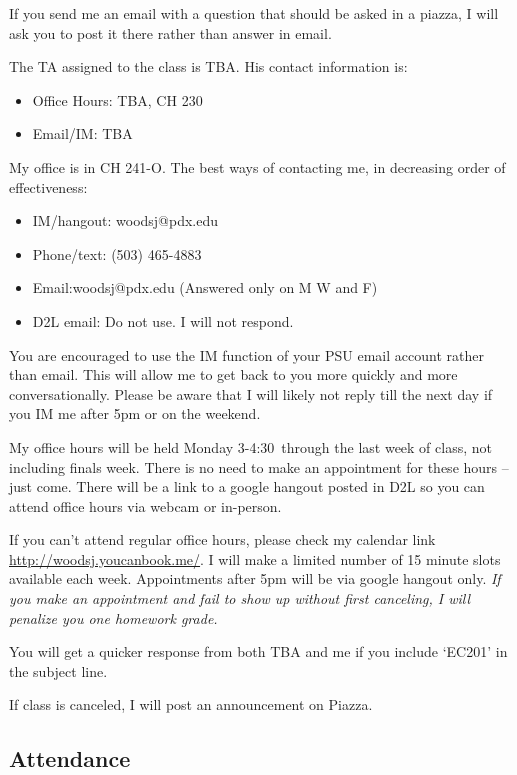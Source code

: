 \documentclass[letterpaper,10pt]{article}
\newcommand{\Office}{Monday 3-4:30}
\begin{document}
If you send me an email with a question that should be asked in a piazza, I
will ask you to post it there rather than answer in email.

The TA assigned to the class is TBA. 
 His contact information is:
 \begin{itemize}
 \item Office Hours: TBA, CH 230

 \item Email/IM: TBA

 \end{itemize}


My office is in CH 241-O.  The best ways of contacting me, in
decreasing order of effectiveness:
\begin{itemize}

\item IM/hangout: woodsj@pdx.edu

\item Phone/text: (503) 465-4883
\item Email:woodsj@pdx.edu (Answered only on M W and F)
\item D2L email: Do not use.  I will not respond.
\end{itemize}

You are encouraged to use the IM function of your PSU email account rather than email. This will allow me to get back to you more quickly and more conversationally. Please be aware that I will likely not reply till the next day if you IM me after 5pm or on the weekend.  

My office hours will be held \Office ~through the last week of class, not including finals week. There is no need to make an appointment for these hours -- just come.  There will be a link to a google hangout posted in D2L so you can attend office hours via webcam or in-person.

If you can't attend regular office hours, please check my calendar link \url{http://woodsj.youcanbook.me/}. I will make a limited number of 15 minute slots available each week. Appointments after 5pm will be via google hangout only. \emph{If you make an appointment and fail to show up without first canceling, I will penalize you one homework grade.}  


You will get a quicker response from both TBA and me if you include `EC201' in the subject line.


If class is canceled, I will post an announcement on Piazza.

\subsection{Attendance}
\end{document}
